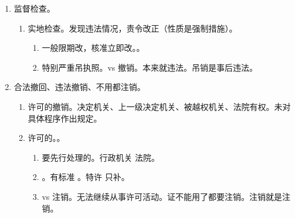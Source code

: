 \begin{enumerate}
\begin{enumerate}
\begin{enumerate}
\begin{enumerate}
                          \item {}。
                          \item {}。
                        \end{enumerate}
                  \item 5207。5 日内申请，20 日把会开起来，7 日前告知。
                  \item 回避。近亲属、调查过的人不能做主持人。
                  \item 笔录。排他效力，是后续决定的唯一根据/依据。。
                \end{enumerate}
          \item 监督检查。
                \begin{enumerate}
                  \item 实地检查。发现违法情况，责令改正（性质是强制措施）。
                        \begin{enumerate}
                          \item 一般限期改，核准立即改。。
                          \item 特别严重吊执照。vs 撤销。本来就违法。吊销是事后违法。
                        \end{enumerate}
                \end{enumerate}
          \item 合法撤回、违法撤销、不用都注销。
                \begin{enumerate}
                  \item 许可的撤销。\yi 决定机关、上一级决定机关、被越权机关、法院有权。\er 未对具体程序作出规定。
                  \item 许可的。。
                        \begin{enumerate}
                          \item 要先行处理的。行政机关 \yjt 法院。
                          \item {}。\yi 有标准 \yjt {}。\er 特许 \yjt 只补。
                          \item vs 注销。无法继续从事许可活动。证不能用了都要注销。注销就是注销。
                                \begin{itemize}

\end{itemize}
\end{enumerate}
\end{enumerate}
\end{enumerate}
\end{enumerate}

